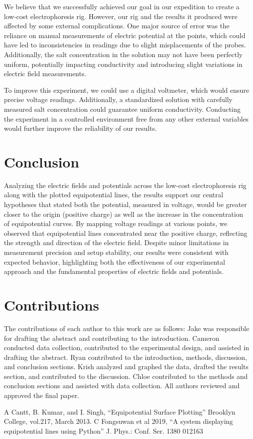 \documentclass[conference]{IEEEtran}
\begin{document}
We believe that we successfully achieved our goal in our expedition to create a low-cost electrophoresis rig. However, our rig and the results it produced were affected by some external complications. One major source of error was the reliance on manual measurements of electric potential at the points, which could have led to inconsistencies in readings due to slight misplacements of the probes. Additionally, the salt concentration in the solution may not have been perfectly uniform, potentially impacting conductivity and introducing slight variations in electric field measurements. 

To improve this experiment, we could use a digital voltmeter, which would ensure precise voltage readings. Additionally, a standardized solution with carefully measured salt concentration could guarantee uniform conductivity. Conducting the experiment in a controlled environment free from any other external variables would further improve the reliability of our results.

\section{Conclusion}
Analyzing the electric fields and potentials across the low-cost electrophoresis rig along with the plotted equipotential lines, the results support our central hypotheses that stated both the potential, measured in voltage, would be greater closer to the origin (positive charge) as well as the increase in the concentration of equipotential curves. By mapping voltage readings at various points, we observed that equipotential lines concentrated near the positive charge, reflecting the strength and direction of the electric field. Despite minor limitations in measurement precision and setup stability, our results were consistent with expected behavior, highlighting both the effectiveness of our experimental approach and the fundamental properties of electric fields and potentials.

\section*{Contributions}
	The contributions of each author to this work are as follows: Jake was responsible for drafting the abstract and contributing to the introduction. Cameron conducted data collection, contributed to the experimental design, and assisted in drafting the abstract. Ryan contributed to the introduction, methods, discussion, and conclusion sections. Krish analyzed and graphed the data, drafted the results section, and contributed to the discussion. Chloe contributed to the methods and conclusion sections and assisted with data collection. All authors reviewed and approved the final paper.

\begin{thebibliography}{00}
 A Cantt, B. Kumar, and I. Singh, ``Equipotential Surface Plotting'' Brooklyn College, vol.217, March 2013.
 C Fongsuwan et al 2019, ``A system displaying equipotential lines using Python'' J. Phys.: Conf. Ser. 1380 012163
\end{thebibliography}
\end{document}
